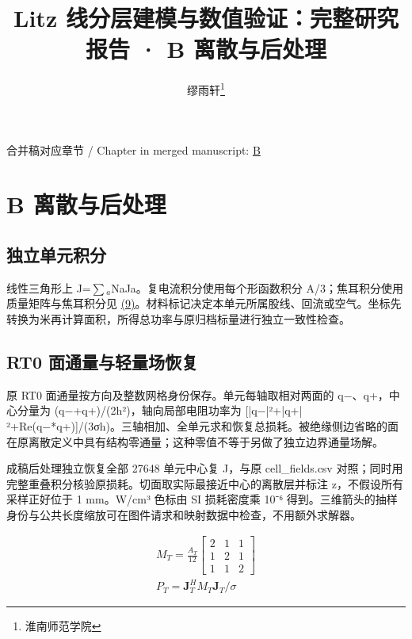 \documentclass[journal,10pt]{IEEEtran}
\begin{document}
\title{Litz 线分层建模与数值验证：完整研究报告 · B 离散与后处理}
\author{缪雨轩\thanks{淮南师范学院}}

\maketitle
\noindent 合并稿对应章节 / Chapter in merged manuscript: \href{report_zh-CN_ieee.pdf#chapter-B}{B}\par
\FloatBarrier
\section*{B 离散与后处理}
\hypertarget{chapter-B}{}
\subsection*{独立单元积分}
\hypertarget{B.triangle_derivation.heading}{}
线性三角形上 J=\(\sum\)\(_a\)NaJa。复电流积分使用每个形函数积分 A/3；焦耳积分使用质量矩阵与焦耳积分见 \href{report_zh-CN_ieee.pdf#E09}{(9)}。材料标记决定本单元所属股线、回流或空气。坐标先转换为米再计算面积，所得总功率与原归档标量进行独立一致性检查。


\subsection*{RT0 面通量与轻量场恢复}
\hypertarget{B.report_rt0.heading}{}
原 RT0 面通量按方向及整数网格身份保存。单元每轴取相对两面的 q−、q+，中心分量为 (q−+q+)/(2h²)，轴向局部电阻功率为 [|q−|²+|q+|²+Re(q−*q+)]/(3σh)。三轴相加、全单元求和恢复总损耗。被绝缘侧边省略的面在原离散定义中具有结构零通量；这种零值不等于另做了独立边界通量场解。


成稿后处理独立恢复全部 27648 单元中心复 J，与原 cell\_fields.csv 对照；同时用完整重叠积分核验原损耗。切面取实际最接近中心的离散层并标注 z，不假设所有采样正好位于 1 mm。W/cm³ 色标由 SI 损耗密度乘 10⁻⁶ 得到。三维箭头的抽样身份与公共长度缩放可在图件请求和映射数据中检查，不用额外求解器。


\hypertarget{E09}{}
\begin{equation}
\begin{gathered}
M_T=\frac{A_T}{12}\begin{bmatrix}2&1&1\\1&2&1\\1&1&2\end{bmatrix} \\
P_T=\mathbf J_T^H M_T\mathbf J_T/\sigma
\end{gathered}
\tag{9}\label{eq:E09}
\end{equation}
\end{document}
